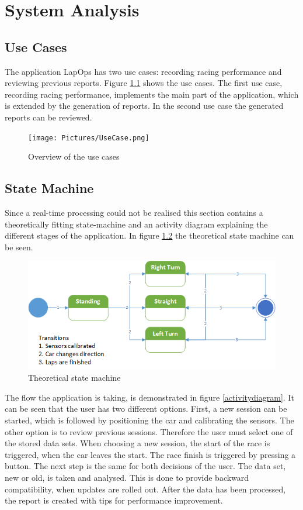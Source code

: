 \chapter{System Analysis}

\section{Use Cases}
The application LapOps has two use cases: recording racing performance and reviewing previous reports. Figure \ref{fig:usecase} shows the use cases. The first use case, recording racing performance, implements the main part of the application, which is extended by the generation of reports. In the second use case the generated reports can be reviewed. 

\begin{figure}[H]
	\centering
	\texttt{[image: Pictures/UseCase.png]}
	\caption{Overview of the use cases}
	\label{fig:usecase}
\end{figure}

\section{State Machine}
Since a real-time processing could not be realised this section contains a theoretically fitting state-machine and an activity diagram explaining the different stages of the application. In figure \ref{statemachine} the theoretical state machine can be seen.

\begin{figure}[H]
	\centering
	\includegraphics[scale=0.8]{Pictures/statemachine.png}
	\caption{Theoretical state machine}
	\label{statemachine}
\end{figure}

The flow the application is taking, is demonstrated in figure \ref{activitydiagram}. It can be seen that the user has two different options. First, a new session can be started, which is followed by positioning the car and calibrating the sensors. The other option is to review previous sessions. Therefore the user must select one of the stored data sets. When choosing a new session, the start of the race is triggered, when the car leaves the start. The race finish is triggered by pressing a button. The next step is the same for both decisions of the user. The data set, new or old, is taken and analysed. This is done to provide backward compatibility, when updates are rolled out. After the data has been processed, the report is created with tips for performance improvement.

